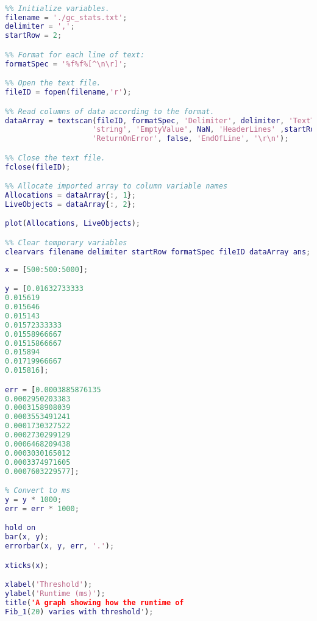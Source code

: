 \documentclass[12pt,a4paper,twoside,openright]{report}
\begin{document}
\begin{figure*}
\begin{lstlisting}[language=Matlab, caption=The script used to produce graphs from the Logger output, label={lst:loggeroutputgraph}]
%% Import data from text file.

%% Initialize variables.
filename = './gc_stats.txt';
delimiter = ',';
startRow = 2;

%% Format for each line of text:
formatSpec = '%f%f%[^\n\r]';

%% Open the text file.
fileID = fopen(filename,'r');

%% Read columns of data according to the format.
dataArray = textscan(fileID, formatSpec, 'Delimiter', delimiter, 'TextType', 
                    'string', 'EmptyValue', NaN, 'HeaderLines' ,startRow-1, 
                    'ReturnOnError', false, 'EndOfLine', '\r\n');

%% Close the text file.
fclose(fileID);

%% Allocate imported array to column variable names
Allocations = dataArray{:, 1};
LiveObjects = dataArray{:, 2};

plot(Allocations, LiveObjects);

%% Clear temporary variables
clearvars filename delimiter startRow formatSpec fileID dataArray ans;
\end{lstlisting}
\end{figure*}

\begin{figure*}
\begin{lstlisting}[language=Matlab, caption=Matlab script for Fib runtime graph w.r.t.~threshold, label={lst:fibbenchthresh}]
x = [500:500:5000];

y = [0.01632733333
0.015619
0.015646
0.015143
0.01572333333
0.01558966667
0.01515866667
0.015894
0.01719966667
0.015816];

err = [0.0003885876135
0.0002950203383
0.0003158908039
0.0003553491241
0.0001730327522
0.0002730299129
0.0006468209438
0.0003030165012
0.0003374971605
0.0007603229577];

% Convert to ms
y = y * 1000;
err = err * 1000;

hold on
bar(x, y);
errorbar(x, y, err, '.');

xticks(x);

xlabel('Threshold');
ylabel('Runtime (ms)');
title('A graph showing how the runtime of 
Fib_1(20) varies with threshold');
\end{lstlisting}
\end{figure*}
\end{document}
